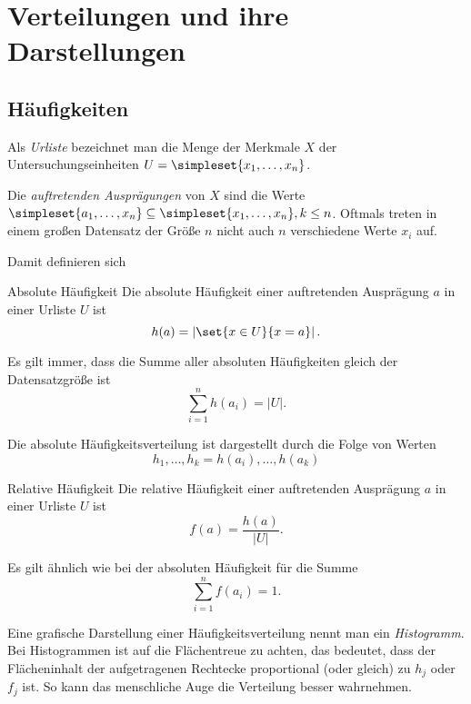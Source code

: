 \chapter{Verteilungen und ihre Darstellungen}
\section{Häufigkeiten}
Als \emph{Urliste} bezeichnet man die Menge der Merkmale $X$ der Untersuchungseinheiten $U=\simpleset{x_1,\ldots,x_n}$.

Die \emph{auftretenden Ausprägungen} von $X$ sind die Werte $\simpleset{a_1,\ldots,x_n}\subseteq\simpleset{x_1,\ldots,x_n}, k\leq n$.
Oftmals treten in einem großen Datensatz der Größe $n$ nicht auch $n$ verschiedene Werte $x_i$ auf.

Damit definieren sich 
\begin{definition}{Absolute Häufigkeit}
	Die absolute Häufigkeit einer auftretenden Ausprägung $a$ in einer Urliste $U$ ist
	\begin{equation*}
		h(a)=\left|\set{x\in U}{x=a}\right|.
	\end{equation*}
\end{definition}
Es gilt immer, dass die Summe aller absoluten Häufigkeiten gleich der Datensatzgröße ist
\begin{equation*}
	\sum\limits_{i=1}^n h(a_i)=|U|.
\end{equation*}

Die absolute Häufigkeitsverteilung ist dargestellt durch die Folge von Werten
$$h_1,\ldots,h_k=h(a_i),\ldots,h(a_k)$$

\begin{definition}{Relative Häufigkeit}
	Die relative Häufigkeit einer auftretenden Ausprägung $a$ in einer Urliste $U$ ist
	\begin{equation*}
		f(a)=\frac{h(a)}{|U|}.
	\end{equation*}
\end{definition}
Es gilt ähnlich wie bei der absoluten Häufigkeit für die Summe
\begin{equation*}
	\sum\limits_{i=1}^n f(a_i)=1.
\end{equation*}


Eine grafische Darstellung einer Häufigkeitsverteilung nennt man ein \emph{Histogramm}. Bei Histogrammen ist auf die Flächentreue zu achten, das bedeutet, dass der Flächeninhalt der aufgetragenen Rechtecke proportional (oder gleich) zu $h_j$ oder $f_j$ ist. So kann das menschliche Auge die Verteilung besser wahrnehmen.

